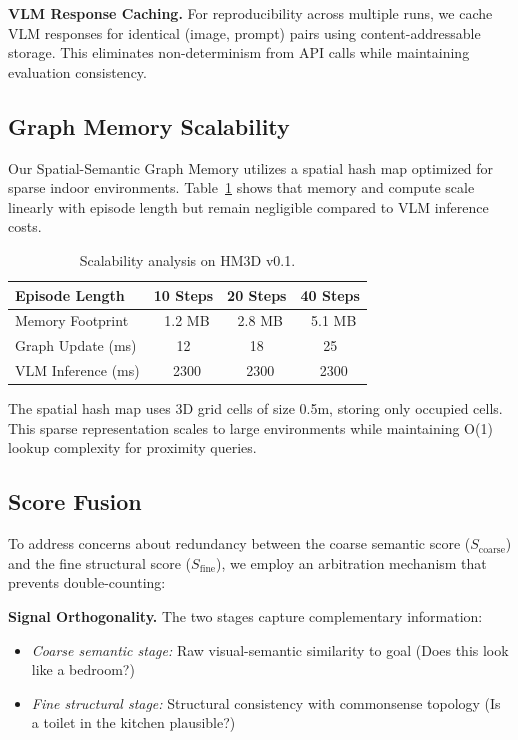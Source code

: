 \documentclass{article}
\begin{document}
\textbf{VLM Response Caching.} For reproducibility across multiple runs, we cache VLM responses for identical (image, prompt) pairs using content-addressable storage. This eliminates non-determinism from API calls while maintaining evaluation consistency.

\subsection{Graph Memory Scalability}

Our Spatial-Semantic Graph Memory utilizes a spatial hash map optimized for sparse indoor environments. Table~\ref{tab:scalability} shows that memory and compute scale linearly with episode length but remain negligible compared to VLM inference costs.

\begin{table}[h]
\centering
\caption{Scalability analysis on HM3D v0.1.}
\label{tab:scalability}
\begin{tabular}{l|ccc}
\toprule
\textbf{Episode Length} & \textbf{10 Steps} & \textbf{20 Steps} & \textbf{40 Steps} \\
\midrule
Memory Footprint & ~1.2 MB & ~2.8 MB & ~5.1 MB \\
Graph Update (ms) & 12 & 18 & 25 \\
VLM Inference (ms) & ~2300 & ~2300 & ~2300 \\
\bottomrule
\end{tabular}
\end{table}

The spatial hash map uses 3D grid cells of size 0.5m, storing only occupied cells. This sparse representation scales to large environments while maintaining O(1) lookup complexity for proximity queries.

\subsection{Score Fusion}

To address concerns about redundancy between the coarse semantic score ($S_{\text{coarse}}$) and the fine structural score ($S_{\text{fine}}$), we employ an arbitration mechanism that prevents double-counting:

\textbf{Signal Orthogonality.} The two stages capture complementary information:
\begin{itemize}
    \item \textit{Coarse semantic stage:} Raw visual-semantic similarity to goal (Does this look like a bedroom?)
    \item \textit{Fine structural stage:} Structural consistency with commonsense topology (Is a toilet in the kitchen plausible?)
\end{itemize}
\end{document}
